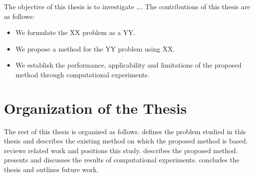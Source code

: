 The objective of this thesis is to investigate \ldots.
The contributions of this thesis are as follows:
\begin{itemize}
  \item We formulate the XX problem as a YY.
  \item We propose a method for the YY problem using XX.
  \item We establish the performance, applicability and limitations of the proposed method through computational experiments.
\end{itemize}

\section{Organization of the Thesis}
\label{sec:organization}

The rest of this thesis is organized as follows.
 defines the problem studied in this thesis and describes the existing method on which the proposed method is based.
 reviews related work and positions this study.
 describes the proposed method.
 presents and discusses the results of computational experiments.
 concludes the thesis and outlines future work.


